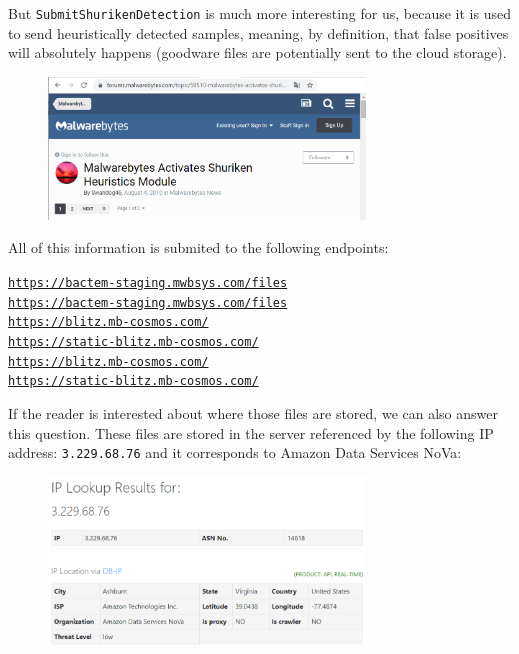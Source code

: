 But \texttt{SubmitShurikenDetection} is much more interesting for us, because
it is used to send heuristically detected samples, meaning, by definition,
that false positives will absolutely happens (goodware files are potentially
sent to the cloud storage).
\begin{figure}[h]
  \centering
  \includegraphics[width=0.75\textwidth]{./figures/SubmitShurikenDetection}
\end{figure}

All of this information is submited to the following endpoints:
\begin{tcolorbox}
  \small
  \href{https://bactem-staging.mwbsys.com/files}{\texttt{https://bactem-staging.mwbsys.com/files}} \\
  \href{https://staging-blitz.mb-cosmos.com/}{\texttt{https://bactem-staging.mwbsys.com/files}} \\
  \href{https://blitz.mb-cosmos.com/}{\texttt{https://blitz.mb-cosmos.com/}} \\
  \href{https://static-blitz.mb-cosmos.com/}{\texttt{https://static-blitz.mb-cosmos.com/}}
  \\ 
  \href{https://blitz.mb-cosmos.com/}{\texttt{https://blitz.mb-cosmos.com/}} \\
  \href{https://static-blitz.mb-cosmos.com/}{\texttt{https://static-blitz.mb-cosmos.com/}}
\end{tcolorbox}
If the reader is interested about where those files are stored, we can also
answer this question. These files are stored in the server referenced by the
following IP address: \texttt{3.229.68.76} and it corresponds to Amazon Data
Services NoVa:

\begin{figure}[h]
  \centering
  \includegraphics[width=0.75\textwidth]{./figures/Lookup}
\end{figure}

